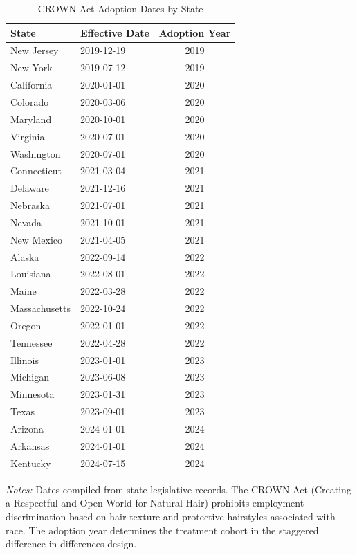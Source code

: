 \begin{table}[htbp]
\centering
\caption{CROWN Act Adoption Dates by State}
\label{tab:crown_dates}
\begin{tabular}{llc}
\toprule
State & Effective Date & Adoption Year \\
\midrule
New Jersey & 2019-12-19 & 2019 \\
New York & 2019-07-12 & 2019 \\
California & 2020-01-01 & 2020 \\
Colorado & 2020-03-06 & 2020 \\
Maryland & 2020-10-01 & 2020 \\
Virginia & 2020-07-01 & 2020 \\
Washington & 2020-07-01 & 2020 \\
Connecticut & 2021-03-04 & 2021 \\
Delaware & 2021-12-16 & 2021 \\
Nebraska & 2021-07-01 & 2021 \\
Nevada & 2021-10-01 & 2021 \\
New Mexico & 2021-04-05 & 2021 \\
Alaska & 2022-09-14 & 2022 \\
Louisiana & 2022-08-01 & 2022 \\
Maine & 2022-03-28 & 2022 \\
Massachusetts & 2022-10-24 & 2022 \\
Oregon & 2022-01-01 & 2022 \\
Tennessee & 2022-04-28 & 2022 \\
Illinois & 2023-01-01 & 2023 \\
Michigan & 2023-06-08 & 2023 \\
Minnesota & 2023-01-31 & 2023 \\
Texas & 2023-09-01 & 2023 \\
Arizona & 2024-01-01 & 2024 \\
Arkansas & 2024-01-01 & 2024 \\
Kentucky & 2024-07-15 & 2024 \\
\bottomrule
\end{tabular}
\begin{tablenotes}[flushleft]
\small
\item \textit{Notes:} Dates compiled from state legislative records. The CROWN Act (Creating a Respectful and Open World for Natural Hair) prohibits employment discrimination based on hair texture and protective hairstyles associated with race. The adoption year determines the treatment cohort in the staggered difference-in-differences design.
\end{tablenotes}
\end{table}
